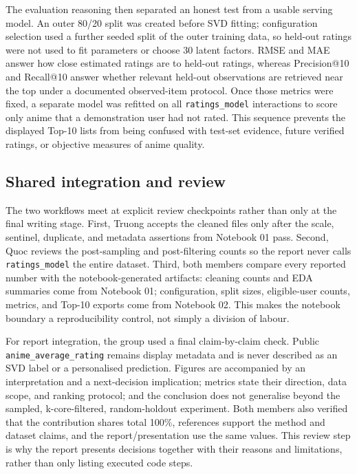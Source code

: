 \documentclass[12pt,a4paper]{article}
\newcommand{\memberone}{Mai Nam Quoc -- 29211145181}
\newcommand{\membertwo}{Truong Nhat Truong -- 29211164915}
\renewcommand{\memberone}{Quoc }
\renewcommand{\membertwo}{Truong }
\begin{document}
The evaluation reasoning then separated an honest test from a usable serving model. An outer 80/20 split was created before SVD fitting; configuration selection used a further seeded split of the outer training data, so held-out ratings were not used to fit parameters or choose 30 latent factors. RMSE and MAE answer how close estimated ratings are to held-out ratings, whereas Precision@10 and Recall@10 answer whether relevant held-out observations are retrieved near the top under a documented observed-item protocol. Once those metrics were fixed, a separate model was refitted on all \texttt{ratings\_model} interactions to score only anime that a demonstration user had not rated. This sequence prevents the displayed Top-10 lists from being confused with test-set evidence, future verified ratings, or objective measures of anime quality.

\subsection{Shared integration and review}
The two workflows meet at explicit review checkpoints rather than only at the final writing stage. First, \membertwo accepts the cleaned files only after the scale, sentinel, duplicate, and metadata assertions from Notebook 01 pass. Second, \memberone reviews the post-sampling and post-filtering counts so the report never calls \texttt{ratings\_model} the entire dataset. Third, both members compare every reported number with the notebook-generated artifacts: cleaning counts and EDA summaries come from Notebook 01; configuration, split sizes, eligible-user counts, metrics, and Top-10 exports come from Notebook 02. This makes the notebook boundary a reproducibility control, not simply a division of labour.

For report integration, the group used a final claim-by-claim check. Public \texttt{anime\_average\_rating} remains display metadata and is never described as an SVD label or a personalised prediction. Figures are accompanied by an interpretation and a next-decision implication; metrics state their direction, data scope, and ranking protocol; and the conclusion does not generalise beyond the sampled, k-core-filtered, random-holdout experiment. Both members also verified that the contribution shares total 100\%, references support the method and dataset claims, and the report/presentation use the same values. This review step is why the report presents decisions together with their reasons and limitations, rather than only listing executed code steps.
\end{document}
